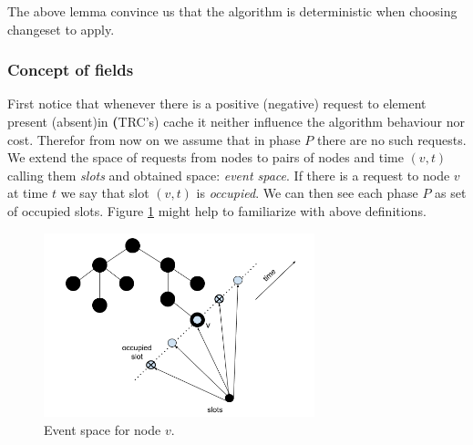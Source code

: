 The above lemma convince us that the algorithm is deterministic when choosing 
changeset to apply.

\subsubsection{Concept of fields}
First notice that whenever there is a positive (negative) request to element 
present (absent)in \textbf(TRC's) cache it neither influence the algorithm 
behaviour nor cost. Therefor from now on we assume that in phase $P$ there are 
no such requests.
We extend the space of requests from nodes to pairs of nodes and time $(v, t)$ 
calling them \textit{slots} and obtained space: \textit{event space}. If there 
is a request to node $v$ at time $t$ we say that slot $(v, t)$ is 
\textit{occupied}. We can then see each phase $P$ as set of occupied slots. 
Figure \ref{fig:spacial_temporal} might help to familiarize with above 
definitions.
\begin{figure}
 \begin{center}
  \includegraphics[width=0.7\textwidth]{spacial_temporal.png}
 \end{center}
 \caption{Event space for node $v$.}
 \label{fig:spacial_temporal}
\end{figure}

